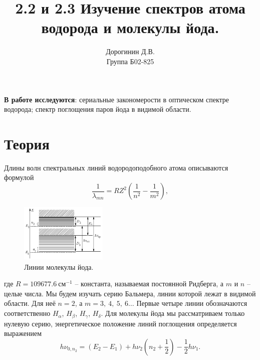\documentclass[a4paper,12pt]{article}
\author{Дорогинин Д.В.\\
Группа Б02-825}
\title{2.2 и 2.3 Изучение спектров атома водорода и молекулы йода.}
\date{\vspace{-10pt}}
\begin{document}
\maketitle
\textbf{В работе исследуются}: сериальные закономерости в оптическом спектре водорода; спектр поглощения паров йода в видимой области.
\section*{Теория}
Длины волн спектральных линий водородоподобного атома описываются формулой
\begin{equation}
\dfrac{1}{\lambda_{mn}} = RZ^2 \left( \dfrac{1}{n^2} - \dfrac{1}{m^2} \right),
\end{equation}
\begin{figure}
\includegraphics[width = 0.37\textwidth]{1.png}
\centering
\caption{Линии молекулы йода.}
\end{figure}
где $R = 109677.6~\text{см}^{-1}$ -- константа, называемая постоянной Ридберга, а $m$ и $n$ -- целые числа. Мы будем изучать серию Бальмера, линии которой лежат в видимой области. Для неё $n = 2$, а $m = 3,~4,~5,~6\dots$ Первые четыре линии обозначаются соответственно $H_\alpha$, $H_\beta$, $H_\gamma$, $H_\delta$.
Для молекулы йода мы рассматриваем только нулевую серию, энергетическое положение линий поглощения определяется выражением
\begin{equation}
h\nu_{0, n_2} = (E_2 - E_1) + h\nu_2 \left( n_2 + \dfrac{1}{2} \right) - \dfrac{1}{2} h \nu_1.
\end{equation}
\end{document}
